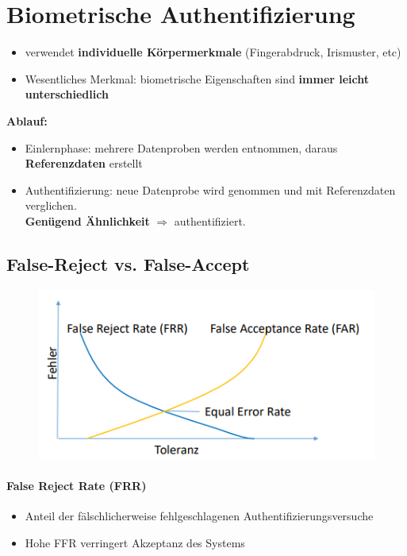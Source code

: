 \section{Biometrische Authentifizierung}
\begin{itemize}
	\item verwendet \textbf{individuelle Körpermerkmale} (Fingerabdruck, Irismuster, etc)
	\item Wesentliches Merkmal: biometrische Eigenschaften sind \textbf{immer leicht unterschiedlich}
\end{itemize}
\textbf{Ablauf:}
\begin{itemize}
	\item Einlernphase: mehrere Datenproben werden entnommen, daraus \textbf{Referenzdaten} erstellt
	\item 	Authentifizierung: neue Datenprobe wird genommen und mit Referenzdaten verglichen.\\ \textbf{Genügend Ähnlichkeit} $\Rightarrow$ authentifiziert.
\end{itemize}

\subsection{False-Reject vs. False-Accept}
\begin{figure}[H]
	\begin{center}
		\includegraphics[scale=0.8]{Resources/FalseRejectFalseAcceptance.PNG}
		\caption{}
		\label{fig:FalseRejectFalseAcceptance.PNG}
	\end{center}
\end{figure}
\paragraph{False Reject Rate (FRR)}
\begin{itemize}
	\item Anteil der fälschlicherweise fehlgeschlagenen Authentifizierungsversuche
	\item Hohe FFR verringert Akzeptanz des Systems
\end{itemize}

